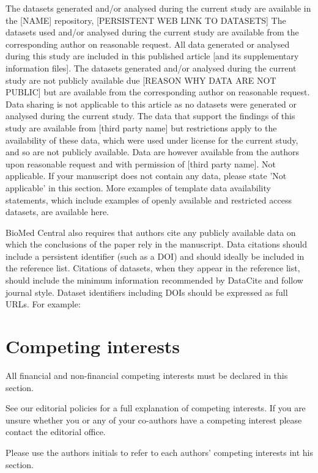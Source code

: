 \documentclass{bmcart}
\begin{document}
\begin{backmatter}
The datasets generated and/or analysed during the current study are available in the [NAME] repository, [PERSISTENT WEB LINK TO DATASETS]
The datasets used and/or analysed during the current study are available from the corresponding author on reasonable request.
All data generated or analysed during this study are included in this published article [and its supplementary information files].
The datasets generated and/or analysed during the current study are not publicly available due [REASON WHY DATA ARE NOT PUBLIC] but are available from the corresponding author on reasonable request.
Data sharing is not applicable to this article as no datasets were generated or analysed during the current study.
The data that support the findings of this study are available from [third party name] but restrictions apply to the availability of these data, which were used under license for the current study, and so are not publicly available. Data are however available from the authors upon reasonable request and with permission of [third party name].
Not applicable. If your manuscript does not contain any data, please state 'Not applicable' in this section.
More examples of template data availability statements, which include examples of openly available and restricted access datasets, are available here.

BioMed Central also requires that authors cite any publicly available data on which the conclusions of the paper rely in the manuscript. Data citations should include a persistent identifier (such as a DOI) and should ideally be included in the reference list. Citations of datasets, when they appear in the reference list, should include the minimum information recommended by DataCite and follow journal style. Dataset identifiers including DOIs should be expressed as full URLs. For example:

\section*{Competing interests}

All financial and non-financial competing interests must be declared in this section.

See our editorial policies for a full explanation of competing interests. If you are unsure whether you or any of your co-authors have a competing interest please contact the editorial office.

Please use the authors initials to refer to each authors' competing interests int his section.


\end{backmatter}
\end{document}
